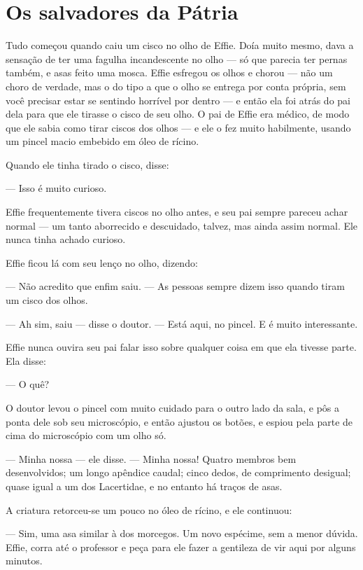 \chapter{Os salvadores da Pátria}

Tudo começou quando caiu um cisco no olho de Effie. Doía muito mesmo,
dava a sensação de ter uma fagulha incandescente no olho — só que
parecia ter pernas também, e asas feito uma mosca. Effie esfregou os
olhos e chorou — não um choro de verdade, mas o do tipo a que o olho
se entrega por conta própria, sem você precisar estar se sentindo
horrível por dentro — e então ela foi atrás do pai dela para que ele
tirasse o cisco de seu olho. O pai de Effie era médico, de modo que
ele sabia como tirar ciscos dos olhos — e ele o fez muito habilmente,
usando um pincel macio embebido em óleo de rícino.

Quando ele tinha tirado o cisco, disse:

— Isso é muito curioso.

Effie frequentemente tivera ciscos no olho antes, e seu pai sempre
pareceu achar normal — um tanto aborrecido e descuidado, talvez, mas
ainda assim normal. Ele nunca tinha achado curioso.

Effie ficou lá com seu lenço no olho, dizendo:

— Não acredito que enfim saiu. — As pessoas sempre dizem isso quando
tiram um cisco dos olhos.

— Ah sim, saiu — disse o doutor. — Está aqui, no pincel. E é muito
interessante.

Effie nunca ouvira seu pai falar isso sobre qualquer coisa em que ela
tivesse parte. Ela disse:

— O quê?

O doutor levou o pincel com muito cuidado para o outro lado da sala, e
pôs a ponta dele sob seu microscópio, e então ajustou os botões, e
espiou pela parte de cima do microscópio com um olho só.

— Minha nossa — ele disse. — Minha nossa! Quatro membros bem
desenvolvidos; um longo apêndice caudal; cinco dedos, de comprimento
desigual; quase igual a um dos Lacertidae, e no entanto há traços de
asas. 

A criatura retorceu-se um pouco no óleo de rícino, e ele continuou:

— Sim, uma asa similar à dos morcegos. Um novo espécime, sem a menor
dúvida. Effie, corra até o professor e peça para ele fazer a
gentileza de vir aqui por alguns minutos.

